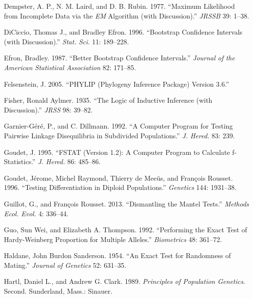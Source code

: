 \documentclass[
  12pt,
]{book}
\newlength{\cslhangindent}
\newlength{\cslentryspacingunit} %
\newenvironment{CSLReferences}[2] %
 {%
  \setlength{\parindent}{0pt}
  \ifodd #1
  \let\oldpar\par
  \def\par{\hangindent=\cslhangindent\oldpar}
  \fi
  \setlength{\parskip}{#2\cslentryspacingunit}
 }%
 {}
\begin{document}
\begin{CSLReferences}{1}{0}
\leavevmode{}%
Dempster, A. P., N. M. Laird, and D. B. Rubin. 1977. {``Maximum Likelihood from Incomplete Data via the {\emph{EM}} Algorithm (with Discussion).''} \emph{JRSSB} 39: 1--38.

\leavevmode{}%
DiCiccio, Thomas J., and Bradley Efron. 1996. {``Bootstrap Confidence Intervals (with Discussion).''} \emph{Stat. Sci.} 11: 189--228.

\leavevmode{}%
Efron, Bradley. 1987. {``Better Bootstrap Confidence Intervals.''} \emph{Journal of the American Statistical Association} 82: 171--85.

\leavevmode{}%
Felsenstein, J. 2005. {``{PHYLIP} (Phylogeny Inference Package) Version 3.6.''}

\leavevmode{}%
Fisher, Ronald Aylmer. 1935. {``The Logic of Inductive Inference (with Discussion).''} \emph{JRSS} 98: 39--82.

\leavevmode{}%
Garnier-Géré, P., and C. Dillmann. 1992. {``A Computer Program for Testing Pairwise Linkage Disequilibria in Subdivided Populations.''} \emph{J. Hered.} 83: 239.

\leavevmode{}%
Goudet, J. 1995. {``FSTAT (Version 1.2): A Computer Program to Calculate f-Statistics.''} \emph{J. Hered.} 86: 485--86.

\leavevmode{}%
Goudet, Jérome, Michel Raymond, Thierry de Meeüs, and François Rousset. 1996. {``Testing Differentiation in Diploid Populations.''} \emph{Genetics} 144: 1931--38.

\leavevmode{}%
Guillot, G., and François Rousset. 2013. {``Dismantling the Mantel Tests.''} \emph{Methods Ecol. Evol.} 4: 336--44.

\leavevmode{}%
Guo, Sun Wei, and Elizabeth A. Thompson. 1992. {``Performing the Exact Test of {H}ardy-{W}einberg Proportion for Multiple Alleles.''} \emph{Biometrics} 48: 361--72.

\leavevmode{}%
Haldane, John Burdon Sanderson. 1954. {``An Exact Test for Randomness of Mating.''} \emph{Journal of Genetics} 52: 631--35.

\leavevmode{}%
Hartl, Daniel L., and Andrew G. Clark. 1989. \emph{Principles of Population Genetics}. Second. Sunderland, Mass.: Sinauer.


\end{CSLReferences}
\end{document}
